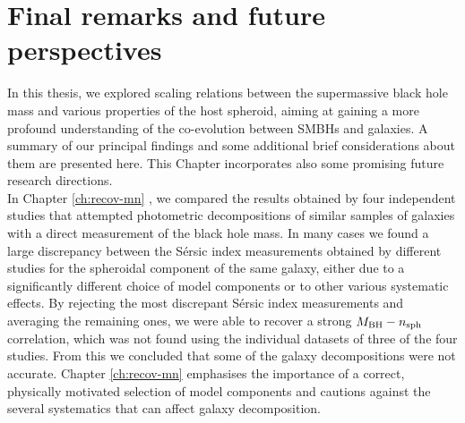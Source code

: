 \chapter{Final remarks and future perspectives}
\label{ch:concl}

In this thesis, we explored scaling relations between the supermassive black hole mass 
and various properties of the host spheroid, 
aiming at gaining a more profound understanding of the co-evolution between SMBHs and galaxies. 
A summary of our principal findings and some additional brief considerations about them are presented here. 
This Chapter incorporates also some promising future research directions. \\

In Chapter \ref{ch:recov-mn} \citep{savorgnan2013}, we compared the results obtained by four independent studies 
\citep{grahamdriver2007,sani2011,vika2012,beifiori2012}
that attempted photometric decompositions of similar samples of galaxies with a direct measurement 
of the black hole mass. 
In many cases we found a large discrepancy between the S\'ersic index measurements 
obtained by different studies for the spheroidal component of the same galaxy, 
either due to a significantly different choice of model components 
or to other various systematic effects. 
By rejecting the most discrepant S\'ersic index measurements and averaging the remaining ones, 
we were able to recover a strong $M_{\rm BH} - n_{\rm sph}$ correlation, 
which was not found using the individual datasets of three of the four studies. 
From this we concluded that some of the galaxy decompositions were not accurate. 
Chapter \ref{ch:recov-mn} emphasises the importance of a correct, physically motivated selection of model components 
and cautions against the several systematics that can affect galaxy decomposition. \\

